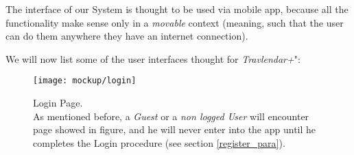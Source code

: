 The interface of our System is thought to be used via mobile app, because all the functionality make sense only in a \textit{movable} context (meaning, such that the user can do them anywhere they have an internet connection).

We will now list some of the user interfaces thought for \textit{Travlendar+}":

\begin{SCfigure}[2.5][h]
	\caption{Login Page. \\
		As mentioned before, a \textit{Guest} or a \textit{non logged User} will encounter page showed in figure, and he will never enter into the app until he completes the Login procedure (see section \ref{register_para}).}
	\texttt{[image: mockup/login]} 
\end{SCfigure}

